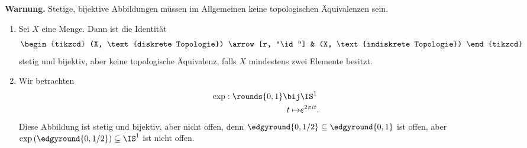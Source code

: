 \documentclass[language=ngerman]{TemplateLecture} %
\begin{document}

\textbf{Warnung.} Stetige, bijektive Abbildungen müssen im Allgemeinen keine topologischen Äquivalenzen sein.

\begin{example}\leavevmode
    \begin{enumerate}[$(i)$]
        \item Sei $X$ eine Menge. Dann ist die Identität
        \begin{equation*}
            \begin{tikzcd}
                (X, \text{diskrete Topologie}) \arrow[r, "\id"] & (X, \text{indiskrete Topologie})
            \end{tikzcd}
        \end{equation*}
        stetig und bijektiv, aber keine topologische Äquivalenz, falls $X$ mindestens zwei Elemente besitzt.
        \item Wir betrachten
        \begin{align*}
            \exp: \rounds{0,1} \bij& \IS^1 \\
            t \mapsto& e^{2\pi i t}.
        \end{align*}
        Diese Abbildung ist stetig und bijektiv, aber nicht offen, denn $\edgyround{0, 1/2} \subseteq \edgyround{0,1}$ ist offen, aber $\exp\left(\edgyround{0,1/2}\right) \subseteq \IS^1$ ist nicht offen.
    \end{enumerate}
\end{example}
\end{document}
